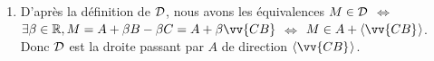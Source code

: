 \documentclass[a4paper,12pt,reqno]{amsart}
\begin{document}
\begin{solution}
  \begin{enumerate}
    \item
    \begin{minipage}[t]{.70\linewidth}
      D'après la définition de $\mathcal{D}$, nous avons les équivalences $M \in \mathcal{D}$ $\Leftrightarrow$ $\exists \beta \in \mathbb{R}, M = A + \beta B - \beta C = A + \beta \vv{CB}$ $\Leftrightarrow$ $M \in A + \affspan{\vv{CB}}$. Donc $\mathcal{D}$ est la droite passant par $A$ de direction $\affspan{\vv{CB}}$\footnotemark.
    \end{minipage}\hspace*{\fill}
    \begin{minipage}[t]{.28\linewidth}~\\[7mm]
      \hspace*{\fill}
      \smash{\scalebox{1.4}{}}
    \end{minipage}


\end{enumerate}
\end{solution}
\end{document}
